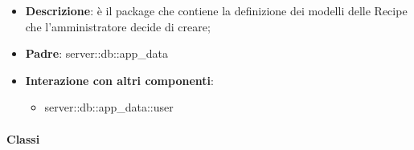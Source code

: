 	\begin{itemize}
		\item \textbf{Descrizione}: è il package che contiene la definizione dei modelli delle Recipe che l'amministratore decide di creare;
		\item \textbf{Padre}: server::db::app\_data
		\item \textbf{Interazione con altri componenti}:
			\begin{itemize}
				\item server::db::app\_data::user
			\end{itemize}
	\end{itemize}


	\paragraph{Classi} %

